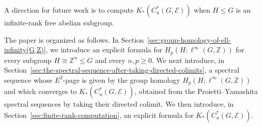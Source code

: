 \documentclass[pdflatex,sn-mathphys-num]{sn-jnl}%
\theoremstyle{plain}
\theoremstyle{remark}
\theoremstyle{definition}
\numberwithin{equation}{section}
\begin{document}
%

A direction for future work is to compute \( K_*(C_u^*(G,\mathcal E)) \) when \( H\leq G \) is an infinite-rank free abelian subgroup.

% 
%
%
%

The paper is organized as follows. In Section~\ref{sec:group-homology-of-ell-infinity(G,Z)}, we introduce an explicit formula for \( H_p(H;\ell^\infty(G,\mathbb Z)) \) for every subgroup \( H \cong \mathbb Z^n \leq G \) and every \( n, p\geq0 \). We next introduce, in Section~\ref{sec:the-spectral-sequence-after-taking-directed-colimits}, a spectral sequence whose \( E^2 \)-page is given by the group homology \( H_p(H;\ell^\infty(G,\mathbb Z)) \) and which converges to \( K_*(C_u^*(G,\mathcal E)) \), obtained from the Proietti--Yamashita spectral sequences by taking their directed colimit. We then introduce, in Section~\ref{sec:finite-rank-computation}, an explicit formula for \( K_*(C_u^*(G,\mathcal E)) \).
\end{document}
